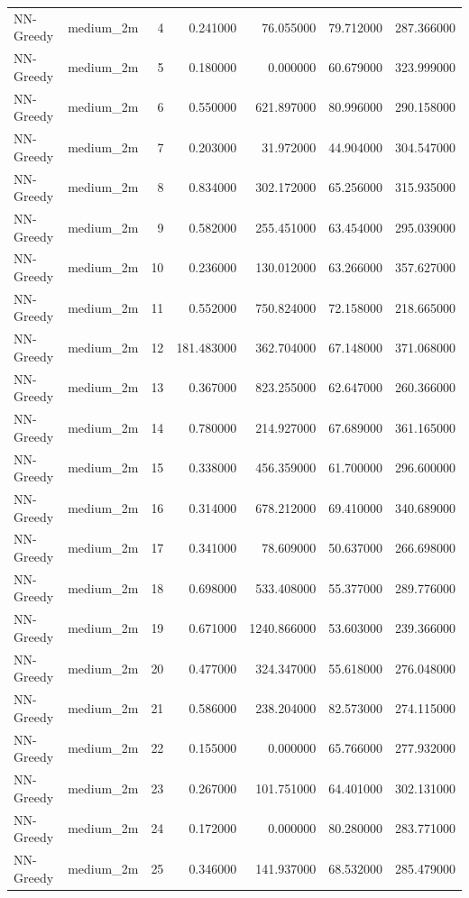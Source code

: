 \begin{tabular}{llrrrrr}
NN-Greedy & medium_2m & 4 & 0.241000 & 76.055000 & 79.712000 & 287.366000 \\
NN-Greedy & medium_2m & 5 & 0.180000 & 0.000000 & 60.679000 & 323.999000 \\
NN-Greedy & medium_2m & 6 & 0.550000 & 621.897000 & 80.996000 & 290.158000 \\
NN-Greedy & medium_2m & 7 & 0.203000 & 31.972000 & 44.904000 & 304.547000 \\
NN-Greedy & medium_2m & 8 & 0.834000 & 302.172000 & 65.256000 & 315.935000 \\
NN-Greedy & medium_2m & 9 & 0.582000 & 255.451000 & 63.454000 & 295.039000 \\
NN-Greedy & medium_2m & 10 & 0.236000 & 130.012000 & 63.266000 & 357.627000 \\
NN-Greedy & medium_2m & 11 & 0.552000 & 750.824000 & 72.158000 & 218.665000 \\
NN-Greedy & medium_2m & 12 & 181.483000 & 362.704000 & 67.148000 & 371.068000 \\
NN-Greedy & medium_2m & 13 & 0.367000 & 823.255000 & 62.647000 & 260.366000 \\
NN-Greedy & medium_2m & 14 & 0.780000 & 214.927000 & 67.689000 & 361.165000 \\
NN-Greedy & medium_2m & 15 & 0.338000 & 456.359000 & 61.700000 & 296.600000 \\
NN-Greedy & medium_2m & 16 & 0.314000 & 678.212000 & 69.410000 & 340.689000 \\
NN-Greedy & medium_2m & 17 & 0.341000 & 78.609000 & 50.637000 & 266.698000 \\
NN-Greedy & medium_2m & 18 & 0.698000 & 533.408000 & 55.377000 & 289.776000 \\
NN-Greedy & medium_2m & 19 & 0.671000 & 1240.866000 & 53.603000 & 239.366000 \\
NN-Greedy & medium_2m & 20 & 0.477000 & 324.347000 & 55.618000 & 276.048000 \\
NN-Greedy & medium_2m & 21 & 0.586000 & 238.204000 & 82.573000 & 274.115000 \\
NN-Greedy & medium_2m & 22 & 0.155000 & 0.000000 & 65.766000 & 277.932000 \\
NN-Greedy & medium_2m & 23 & 0.267000 & 101.751000 & 64.401000 & 302.131000 \\
NN-Greedy & medium_2m & 24 & 0.172000 & 0.000000 & 80.280000 & 283.771000 \\
NN-Greedy & medium_2m & 25 & 0.346000 & 141.937000 & 68.532000 & 285.479000 \\

\end{tabular}
